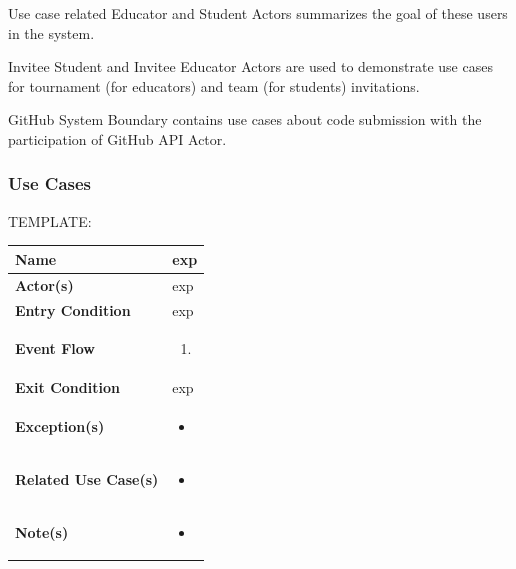 \quad Use case related Educator and Student Actors summarizes the goal of these users in the system.

\quad Invitee Student and Invitee Educator Actors are used to demonstrate use cases for tournament (for educators) and team (for students) invitations.

\quad GitHub System Boundary contains use cases about code submission with the participation of GitHub API Actor.


\subsubsection{Use Cases}

TEMPLATE:

\begin{center}
    \begin{tabular}{ | m{10em} | m{10cm}| } 
      \hline
      \textbf{Name} & exp  \\ 
      \hline
      \textbf{Actor(s)} & exp \\ 
      \hline
      \textbf{Entry Condition} & exp \\ 
      \hline
      \textbf{Event Flow} & 
          \begin{enumerate}[(1)]
              \item 
          \end{enumerate}
      \\ 
      \hline
      \textbf{Exit Condition} & exp  \\ 
      \hline
      \textbf{Exception(s)} & 
      \begin{itemize}
          \item 
      \end{itemize}
          \\ 
      \hline
      \textbf{Related Use Case(s)} & 
      \begin{itemize}
          \item 
      \end{itemize}
          \\ 
      \hline
      \textbf{Note(s)} & 
      \begin{itemize}
          \item 
      \end{itemize}
          \\ 
      \hline
    \end{tabular}
\end{center}

